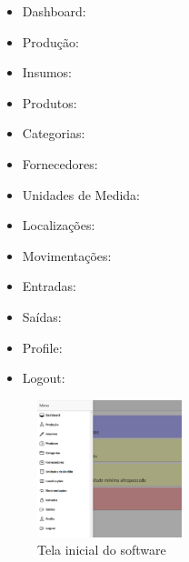 \documentclass[letterpaper, 12 pt]{article}
\begin{document}
\begin{itemize}
  \item Dashboard:
  \item Produção:
  \item Insumos:
  \item Produtos:
  \item Categorias:
  \item Fornecedores:
  \item Unidades de Medida:
  \item Localizações:
  \item Movimentações:
  \item Entradas:
  \item Saídas:
  \item Profile:
  \item Logout:
\end{itemize}

\begin{figure}[h]
\centering %
\includegraphics[height=4cm]{imagens/menu1.PNG} 
\caption{Tela inicial do software}
\label{figura:menu1}
\end{figure}
%

\end{document}
